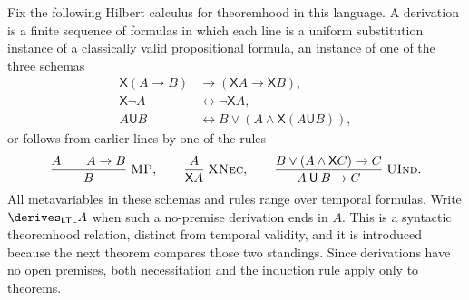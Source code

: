 Fix the following Hilbert calculus for theoremhood in this language.  A
derivation is a finite sequence of formulas in which each line is a uniform
substitution instance of a classically valid propositional formula, an
instance of
one of the three schemas
\[
\begin{aligned}
  \mathsf X(A\to B)&\to(\mathsf XA\to\mathsf XB),\\
  \mathsf X\neg A&\leftrightarrow\neg\mathsf XA,\\
  A\mathbin{\mathsf U}B
    &\leftrightarrow
      B\lor(A\land\mathsf X(A\mathbin{\mathsf U}B)),
\end{aligned}
\]
or follows from earlier lines by one of the rules
\[
  \frac{A\qquad A\to B}{B}\;\textsc{MP},
  \qquad
  \frac{A}{\mathsf XA}\;\textsc{XNec},
  \qquad
  \frac{B\lor(A\land\mathsf X C)\to C}
       {A\mathbin{\mathsf U}B\to C}\;\textsc{UInd}.
\]
All metavariables in these schemas and rules range over temporal formulas.
Write \(\derives_{\mathsf{LTL}}A\) when such a no-premise derivation ends in
\(A\).  This is a syntactic theoremhood relation, distinct from temporal
validity, and it is introduced because the next theorem compares those two
standings.  Since derivations have no open premises, both necessitation and the
induction rule apply only to theorems.

